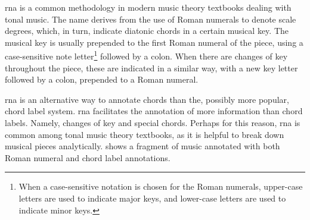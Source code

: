 

\gls{rna} is a common methodology in modern music theory
textbooks dealing with tonal music. The name derives from
the use of Roman numerals to denote scale degrees, which, in
turn, indicate diatonic chords in a certain musical key. The
musical key is usually prepended to the first Roman numeral
of the piece, using a case-sensitive note
letter\footnote{When a case-sensitive notation is chosen for
the Roman numerals, upper-case letters are used to indicate
major keys, and lower-case letters are used to indicate
minor keys.} followed by a colon. When there are changes of
key throughout the piece, these are indicated in a similar
way, with a new key letter followed by a colon, prepended to
a Roman numeral.

\gls{rna} is an alternative way to annotate chords than the,
possibly more popular, chord label system. \gls{rna}
facilitates the annotation of more information than chord
labels. Namely, changes of key and special chords. Perhaps
for this reason, \gls{rna} is common among tonal music
theory textbooks, as it is helpful to break down musical
pieces analytically.  shows a fragment of
music annotated with both Roman numeral and chord label
annotations.

